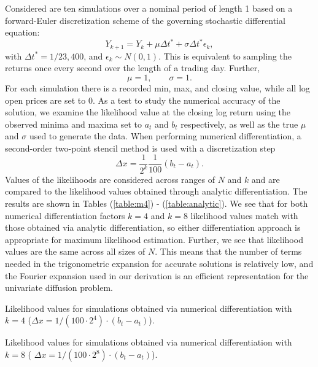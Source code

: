 Considered are ten simulations over a nominal period of length 1 based on a forward-Euler discretization scheme of the governing stochastic differential equation:
\begin{equation} 
	Y_{k+1} = Y_{k} + \mu \Delta t^* + \sigma \Delta t^* \epsilon_k, \label{eq:SDE-discrete}
\end{equation}
with $\Delta t^* = 1/23,400$,  and $\epsilon_k \sim N(0,1)$. This is equivalent to sampling the returns once every second over the length of a trading day. Further, 
\[ \mu = 1, \qquad \sigma = 1. \]
For each simulation there is a recorded min, max, and closing value, while all log open prices are set to 0. As a test to study the numerical accuracy of the solution, we examine the likelihood value at the closing log return using the observed minima and maxima set to $a_t$ and $b_t$ respectively, as well as the true $\mu$ and $\sigma$ used to generate the data. When performing numerical differentiation, a second-order two-point stencil method is used with a discretization step
\[ 
	\Delta x = \frac{1}{2^k} \frac{1}{100} (b_t - a_t).
\]
Values of the likelihoods are considered across ranges of $N$ and $k$ and are compared to the likelihood values obtained through analytic differentiation. The results are shown in Tables (\ref{table:m4}) - (\ref{table:analytic}). We see that for both numerical differentiation factors $k=4$ and $k=8$ likelihood values match with those obtained via analytic differentiation, so either differentiation approach is appropriate for maximum likelihood estimation. Further, we see that likelihood values are the same across all sizes of $N$. This means that the number of terms needed in the trigonometric expansion for accurate solutions is relatively low, and the Fourier expansion used in our derivation is an efficient representation for the univariate diffusion problem.

\begin{table}
	\centering
	\caption{Likelihood values for simulations obtained via numerical differentiation with $k=4$ ($\Delta x = 1/(100 \cdot 2^4) \cdot (b_t-a_t)$). }
	\label{table:m4}
\end{table}

\begin{table}
	\centering
	\caption{Likelihood values for simulations obtained via numerical differentiation with $k=8$ ( $\Delta x = 1/(100 \cdot 2^8) \cdot (b_t-a_t)$). }
	\label{table:m8}
\end{table}

